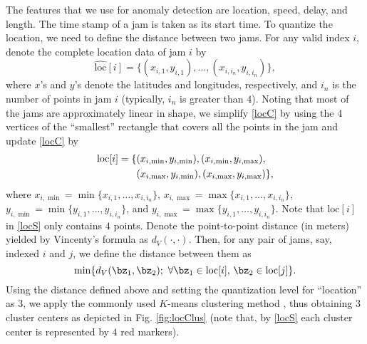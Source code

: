 \documentclass[10pt, twocolumn]{IEEEtran}
\begin{document}
The features that we use for anomaly detection are location, speed,
delay, and length. The time stamp of a jam is taken as its start time.
To quantize the location, we need to define the distance between two
jams. For any valid index $i$, denote the complete location data of jam
$i$ by
\begin{equation}
\widehat{\text{loc}}[i] = \{(x_{i,1}, y_{i,1}), \ldots, (x_{i,i_n},
y_{i,i_n})\}, \label{locC} 
\end{equation}
where $x$'s and $y$'s denote the latitudes and longitudes, respectively,
and $i_n$ is the number of points in jam $i$ (typically, $i_n$ is
greater than $4$). Noting that most of the jams are approximately linear
in shape, we simplify \eqref{locC} by using the 4 vertices of the
``smallest'' rectangle that covers all the points in the jam and 
update \eqref{locC} by
\begin{align}
\text{loc}[i] = \{&(x_{i,\text{min}}, y_{i,\text{min}}), (x_{i,\text{min}}, y_{i,\text{max}}), \notag \\ &(x_{i,\text{max}}, y_{i,\text{min}}), (x_{i,\text{max}}, y_{i,\text{max}})\}, \label{locS}
\end{align}
where $ {x_{i,\min }} = \min \{ {{x_{i,1}}, \ldots ,{x_{i,{i_n}}}} \}$,
${x_{i,\max }} = \max \{ {{x_{i,1}}, \ldots ,{x_{i,{i_n}}}} \}$,
${y_{i,\min }} = \min \{ {{y_{i,1}}, \ldots ,{y_{i,{i_n}}}} \}$, and
${y_{i,\max }} = \max \{ {{y_{i,1}}, \ldots ,{y_{i,{i_n}}}} \} $.  Note
that $\text{loc}[i]$ in \eqref{locS} only contains $4$ points.  Denote
the point-to-point distance (in meters) yielded by Vincenty's formula
\cite{Vincenty} as $d_V(\cdot,\cdot)$. Then, for any pair of jams, say,
indexed $i$ and $j$, we define the distance between them as
\[
\min \{ d_V(\bz_1, \bz_2);\ \forall \bz_1\in \text{loc}[i],\, \bz_2 \in
\text{loc}[j] \}.  
\] 
Using the distance defined above and setting the quantization level for
``location'' as $3$, we apply the commonly used $K$-means clustering
method \cite{kmeans}, thus obtaining 3 cluster centers as depicted in
Fig. \ref{fig:locClus} (note that, by \eqref{locS} each cluster center
is represented by $4$ red markers).
\end{document}
